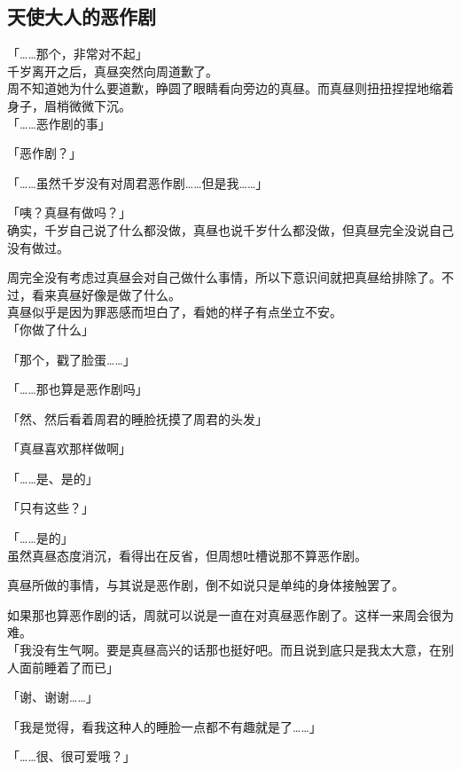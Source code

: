 \subsection{天使大人的恶作剧}

「……那个，非常对不起」\\

千岁离开之后，真昼突然向周道歉了。\\

周不知道她为什么要道歉，睁圆了眼睛看向旁边的真昼。而真昼则扭扭捏捏地缩着身子，眉梢微微下沉。\\

「……恶作剧的事」

「恶作剧？」

「……虽然千岁没有对周君恶作剧……但是我……」

「咦？真昼有做吗？」\\

确实，千岁自己说了什么都没做，真昼也说千岁什么都没做，但真昼完全没说自己没有做过。

周完全没有考虑过真昼会对自己做什么事情，所以下意识间就把真昼给排除了。不过，看来真昼好像是做了什么。\\

真昼似乎是因为罪恶感而坦白了，看她的样子有点坐立不安。\\

「你做了什么」

「那个，戳了脸蛋……」

「……那也算是恶作剧吗」

「然、然后看着周君的睡脸抚摸了周君的头发」

「真昼喜欢那样做啊」

「……是、是的」

「只有这些？」

「……是的」\\

虽然真昼态度消沉，看得出在反省，但周想吐槽说那不算恶作剧。

真昼所做的事情，与其说是恶作剧，倒不如说只是单纯的身体接触罢了。

如果那也算恶作剧的话，周就可以说是一直在对真昼恶作剧了。这样一来周会很为难。\\

「我没有生气啊。要是真昼高兴的话那也挺好吧。而且说到底只是我太大意，在别人面前睡着了而已」

「谢、谢谢……」

「我是觉得，看我这种人的睡脸一点都不有趣就是了……」

「……很、很可爱哦？」

